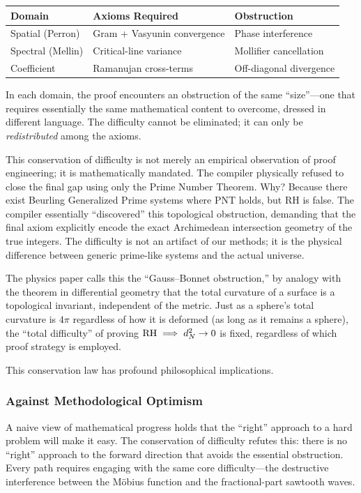 \begin{center}
\small
\begin{tabular}{@{}lll@{}}
\toprule
\textbf{Domain} & \textbf{Axioms Required} & \textbf{Obstruction} \\
\midrule
Spatial (Perron) & Gram + Vasyunin convergence & Phase interference \\
Spectral (Mellin) & Critical-line variance & Mollifier cancellation \\
Coefficient & Ramanujan cross-terms & Off-diagonal divergence \\
\bottomrule
\end{tabular}
\end{center}

\noindent In each domain, the proof encounters an obstruction
of the same ``size''---one that requires essentially the same
mathematical content to overcome, dressed in different language.
The difficulty cannot be eliminated; it can only be
\emph{redistributed} among the axioms.

This conservation of difficulty is not merely an empirical
observation of proof engineering; it is mathematically mandated.
The compiler physically refused to close the final gap using only
the Prime Number Theorem. Why? Because there exist Beurling
Generalized Prime systems where PNT holds, but RH is false. The
compiler essentially ``discovered'' this topological obstruction,
demanding that the final axiom explicitly encode the exact
Archimedean intersection geometry of the true integers. The
difficulty is not an artifact of our methods; it is the physical
difference between generic prime-like systems and the actual
universe.

The physics paper calls this the ``Gauss--Bonnet obstruction,''
by analogy with the theorem in differential geometry that the
total curvature of a surface is a topological invariant,
independent of the metric. Just as a sphere's total curvature
is $4\pi$ regardless of how it is deformed (as long as it remains
a sphere), the ``total difficulty'' of proving
$\mathrm{RH} \implies d_N^2 \to 0$ is fixed, regardless of which proof
strategy is employed.

This conservation law has profound philosophical implications.

\subsubsection{Against Methodological Optimism}

A naive view of mathematical progress holds that the ``right''
approach to a hard problem will make it easy. The conservation
of difficulty refutes this: there is no ``right'' approach to
the forward direction that avoids the essential obstruction.
Every path requires engaging with the same core difficulty---the
destructive interference between the M\"obius function and the
fractional-part sawtooth waves.

